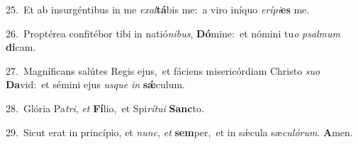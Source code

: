 {\numbfont\textcolor{\numbcolor}{25.}}~Et ab insurgéntibus in me \textit{ex}\-\textit{al}\textbf{tá}bis me:~\star a viro iníquo \textit{e}\-\textit{rí}\textit{pi}\textbf{es} me.\par
{\numbfont\textcolor{\numbcolor}{26.}}~Proptérea confitébor tibi in natió\-\textit{ni}\-\textit{bus}, \textbf{Dó}\-mine:~\star et nómini tu\textit{o} \textit{psal}\-\textit{mum} \textbf{di}\-cam.\par
{\numbfont\textcolor{\numbcolor}{27.}}~Magníficans salútes Regis ejus,~\dagger et fáciens misericórdiam Christo \textit{su}\-\textit{o} \textbf{Da}\-vid:~\star et sémini ejus \textit{us}\-\textit{que} \textit{in} \textbf{sǽ}\-culum.\par
{\numbfont\textcolor{\numbcolor}{28.}}~Glória Pa\-\textit{tri}\-, \textit{et} \textbf{Fí}\-lio,~\star et Spi\-\textit{rí}\-\textit{tu}\textit{i} \textbf{Sanc}\-to.\par
{\numbfont\textcolor{\numbcolor}{29.}}~Sicut erat in princípio, et \textit{nunc}\-, \textit{et} \textbf{sem}\-per,~\star et in sǽcula sæ\-\textit{cu}\-\textit{ló}\textit{rum}. \textbf{A}\-men.\par
